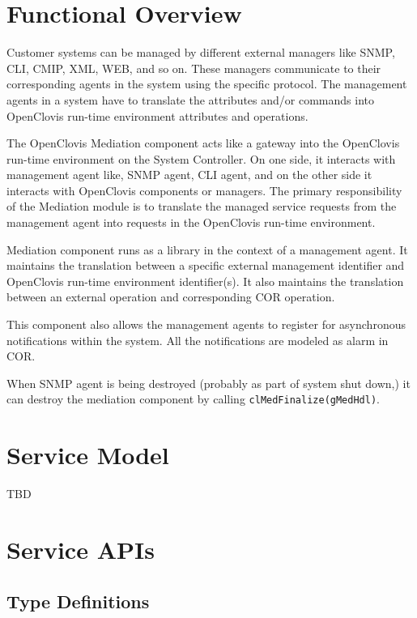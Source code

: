 
\hypertarget{group__group27}{
\chapter{Functional Overview}
\label{group__group27}
}

\begin{flushleft}
Customer systems can be managed by different external managers like SNMP, CLI, CMIP, XML, WEB, and so on. These managers communicate to
their corresponding agents in the system using the specific protocol. The management agents in a system have to 
translate the attributes and/or commands into OpenClovis run-time environment attributes and operations. \par
 \par
 The OpenClovis Mediation component acts like a gateway into the OpenClovis run-time environment on the System Controller. On one side, it interacts 
 with management agent like, SNMP agent, CLI agent, and on the other side it interacts with OpenClovis components or managers. The primary
 responsibility of the Mediation module is to translate the managed service requests from the management agent into requests in the OpenClovis 
 run-time environment. \par
 \par
 Mediation component runs as a library in the context of a management agent. It maintains the translation between a specific external management identifier and 
 OpenClovis run-time environment identifier(s). It also maintains the translation between an external operation and corresponding COR operation. \par
 \par
 This component also allows the management agents to register for asynchronous notifications within the system. All the notifications are modeled as alarm in COR.

When SNMP agent is being destroyed (probably as part of system shut down,) it can destroy the mediation component by calling
{\tt{cl\-Med\-Finalize(g\-Med\-Hdl)}}.

\chapter{Service Model}
TBD


\chapter{Service APIs}

\section{Type Definitions}

\end{flushleft}
